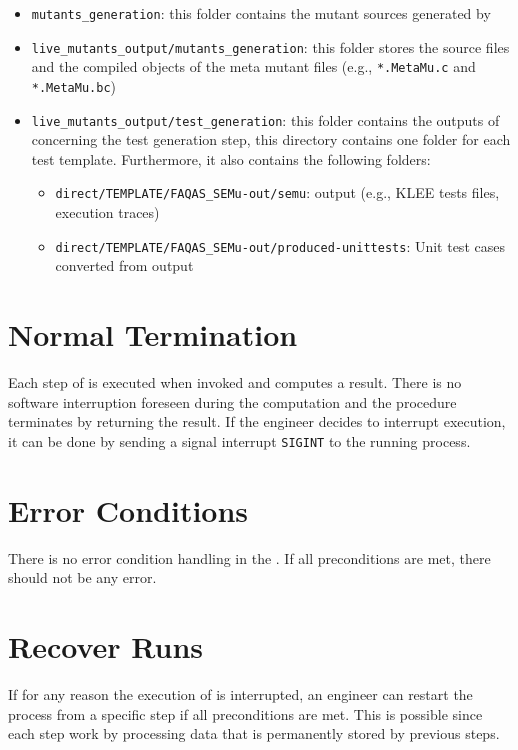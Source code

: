 \begin{itemize}
	\item \texttt{mutants\_generation}: this folder contains the mutant sources generated by \MASS
	\item \texttt{live\_mutants\_output/mutants\_generation}: this folder stores the source files and the compiled objects of the meta mutant files (e.g., \texttt{*.MetaMu.c} and \texttt{*.MetaMu.bc})
	\item \texttt{live\_mutants\_output/test\_generation}: this folder contains the outputs of \SEMUS concerning the test generation step, this directory contains one folder for each test template. Furthermore, it also contains the following folders:
	\begin{itemize}
		\item \texttt{direct/TEMPLATE/FAQAS\_SEMu-out/semu}: \SEMU output (e.g., KLEE tests files, execution traces)
		\item \texttt{direct/TEMPLATE/FAQAS\_SEMu-out/produced-unittests}: Unit test cases converted from \SEMU output
	\end{itemize}

\end{itemize}



\section{Normal Termination}


Each step of \SEMUS is executed when invoked and computes a result. There is no software interruption foreseen during the computation and the procedure terminates by returning the result.
If the engineer decides to interrupt \SEMUS execution, it can be done by sending a signal interrupt \texttt{SIGINT} to the running process.

\section{Error Conditions}

There is no error condition handling in the \FAQAS. If all preconditions are met, there should not be any error.

\section{Recover Runs}


If for any reason the execution of \SEMUS is interrupted, an engineer can restart the process from a specific step if all preconditions are met. This is possible since each \SEMUS step work by processing data that is permanently stored by previous steps.
